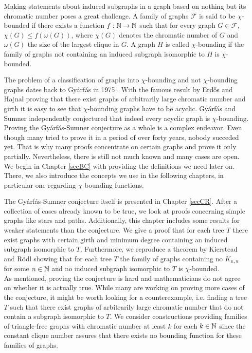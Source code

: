 Making statements about induced subgraphs in a graph based on nothing but its chromatic number poses a great challenge. A family of graphs $\mathcal{F}$ is said to be $\chi$-bounded if there exists a function $f:\mathbb{N}\to\mathbb{N}$ such that for every graph $G\in\mathcal{F}$, $\chi (G)\leq f(\omega (G))$, where $\chi (G)$ denotes the chromatic number of $G$ and $\omega (G)$ the size of the largest clique in $G$. A graph $H$ is called $\chi$-bounding if the family of graphs not containing an induced subgraph isomorphic to $H$ is $\chi$-bounded.

The problem of a classification of graphs into $\chi$-bounding and not $\chi$-bounding graphs dates back to Gyárfás in 1975 \cite{Gy75}. With the famous result by Erd\H{o}s and Hajnal proving that there exist graphs of arbitrarily large chromatic number and girth it is easy to see that $\chi$-bounding graphs have to be acyclic. Gyárfás \cite{Gy75} and Sumner \cite{Su81} independently conjectured that indeed every acyclic graph is $\chi$-bounding. Proving the Gyárfás-Sumner conjecture as a whole is a complex endeavor. Even though many tried to prove it in a period of over forty years, nobody succeded yet. That is why many proofs concentrate on certain graphs and prove it only partially. Nevertheless, there is still not much known and many cases are open.
\\

We begin in Chapter \ref{secBC} with providing the definitions we need later on. There, we also introduce the concepts we use in the following chapters, in particular one regarding $\chi$-bounding functions.

The Gyárfás-Sumner conjecture itself is presented in Chapter \ref{secCR}. After a collection of cases already known to be true, we look at proofs concerning simple graphs like stars and paths. Additionally, this chapter includes some results for weaker statements than the conjecture. We give a proof that for each tree $T$ there exist graphs with certain girth and minimum degree containing an induced subgraph isomorphic to $T$. Furthermore, we reproduce a theorem by Kierstead and Rödl \cite{Ki96} showing that for each tree $T$ the family of graphs containing no $K_{n,n}$ for some $n\in\mathbb{N}$ and no induced subgraph isomorphic to $T$ is $\chi$-bounded.
\\

As mentioned, proving the conjecture is hard and mathematicians do not agree on whether it is actually true. While many are working on proving more cases of the conjecture, it might be worth looking for a counterexample, i.e. finding a tree $T$ such that there exist graphs of arbitrarily large chromatic number that do not contain a subgraph isomorphic to $T$. We consider constructions providing families of triangle-free graphs with chromatic number at least $k$ for each $k\in\mathbb{N}$ since the constant clique number assures that there exists no bounding function for these families of graphs.

